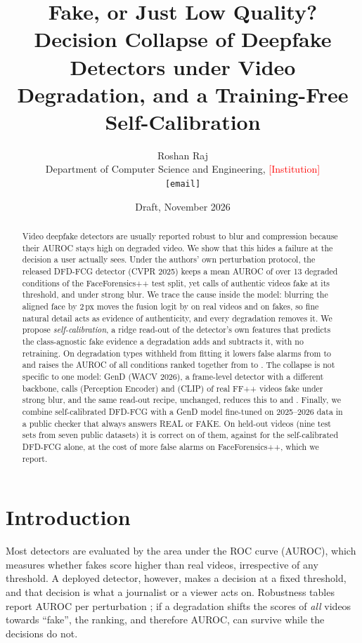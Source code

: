 \documentclass[11pt]{article}
\title{Fake, or Just Low Quality? Decision Collapse of Deepfake Detectors under Video Degradation, and a Training-Free Self-Calibration}
\author{Roshan Raj\\ \small Department of Computer Science and Engineering, \textcolor{red}{[Institution]}\\ \small \texttt{[email]}}
\date{Draft, November 2026}
\begin{document}
\maketitle

\begin{abstract}
Video deepfake detectors are usually reported robust to blur and compression because their AUROC stays high on
degraded video. We show that this hides a failure at the decision a user actually sees. Under the authors' own
perturbation protocol, the released DFD-FCG detector (CVPR 2025) keeps a mean AUROC of \OrigDegAuroc{} over 13
degraded conditions of the FaceForensics++ test split, yet calls \OrigFA{} of authentic videos fake at its threshold,
and \OrigFAGBFive{} under strong blur. We trace the cause inside the model: blurring the aligned face by 2\,px moves the
fusion logit by \ProbeReal{} on real videos and \ProbeFake{} on fakes, so fine natural detail acts as evidence of
authenticity, and every degradation removes it. We propose \emph{self-calibration}, a ridge read-out of the
detector's own features that predicts the class-agnostic fake evidence a degradation adds and subtracts it, with no
retraining. On degradation types withheld from fitting it lowers false alarms from \OrigFA{} to \SCFA{} and raises
the AUROC of all conditions ranked together from \OrigPooled{} to \SCPooled{}. The collapse is not specific to one
model: GenD (WACV 2026), a frame-level detector with a different backbone, calls \PeRawFAFfppGBFive{} (Perception
Encoder) and \ClipRawFAFfppGBFive{} (CLIP) of real FF++ videos fake under strong blur, and the same read-out recipe,
unchanged, reduces this to \PeCalFAFfppGBFive{} and \ClipCalFAFfppGBFive{}. Finally, we combine self-calibrated DFD-FCG
with a GenD model fine-tuned on 2025--2026 data in a public checker that always answers REAL or FAKE. On \AllN{}
held-out videos (nine test sets from seven public datasets) it is correct on \AllAcc{} of them, against \AllAccBase{} for the self-calibrated
DFD-FCG alone, at the cost of more false alarms on FaceForensics++, which we report.
\end{abstract}

\section{Introduction}
Most detectors are evaluated by the area under the ROC curve (AUROC), which measures whether fakes score higher than
real videos, irrespective of any threshold. A deployed detector, however, makes a decision at a fixed threshold, and
that decision is what a journalist or a viewer acts on. Robustness tables report AUROC per perturbation
\cite{han2025dfdfcg}; if a degradation shifts the scores of \emph{all} videos towards ``fake'', the ranking, and
therefore AUROC, can survive while the decisions do not.
\end{document}
